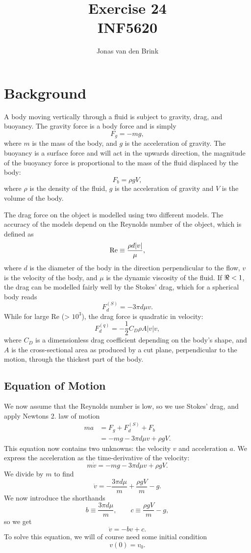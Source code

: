 \documentclass[a4paper, 11pt, titlepage, english]{article}
\author{Jonas van den Brink}
\title{Exercise 24 \\ INF5620}
\begin{document}
\maketitle

\section{Background}

A body moving vertically through a fluid is subject to gravity, drag, and buoyancy. The gravity force is a body force and is simply
$$F_g = -mg,$$
where $m$ is the mass of the body, and $g$ is the acceleration of gravity. The buoyancy is a surface force and will act in the upwards direction, the magnitude of the buoyancy force is proportional to the mass of the fluid displaced by the body:
$$F_b = \rho g V,$$
where $\rho$ is the density of the fluid, $g$ is the acceleration of gravity and $V$ is the volume of the body.

The drag force on the object is modelled using two different models. The accuracy of the models depend on the Reynolds number of the object, which is defined as
$${\rm Re} \equiv \frac{\rho d|v|}{\mu},$$
where $d$ is the diameter of the body in the direction perpendicular to the flow, $v$ is the velocity of the body, and $\mu$ is the dynamic viscosity of the fluid. If ${\rm \Re} < 1$, the drag can be modelled fairly well by the Stokes' drag, which for a spherical body reads
$$F_d^{(S)}  = -3\pi d \mu v.$$
While for large Re (> $10^3$), the drag force is quadratic in velocity:
$$F_d^{(q)} = -\frac{1}{2}C_D \rho A|v|v,$$
where $C_D$ is a dimensionless drag coefficient depending on the body's shape, and $A$ is the cross-sectional area as produced by a cut plane, perpendicular to the motion, through the thickest part of the body.

\subsection{Equation of Motion}
We now assume that the Reynolds number is low, so we use Stokes' drag, and apply Newtons 2. law of motion
\begin{align*}
ma &= F_g + F_d^{(S)} + F_b \\
&= -mg - 3\pi d \mu v + \rho g V.
\end{align*}
This equation now contains two unknowns: the velocity $v$ and acceleration $a$. We express the acceleration as the time-derivative of the velocity:
$$m\dot{v} = -mg -3\pi d \mu v + \rho g V.$$
We divide by $m$ to find
$$\dot{v} = - \frac{3 \pi d \mu}{m} + \frac{\rho g V}{m} - g.$$
We now introduce the shorthands
$$b \equiv \frac{3 \pi d \mu}{m}, \qquad c \equiv \frac{\rho g V}{m} - g,$$
so we get
$$\dot{v} = -b v + c.$$
To solve this equation, we will of course need some initial condition
$$v(0) = v_0.$$
\end{document}
